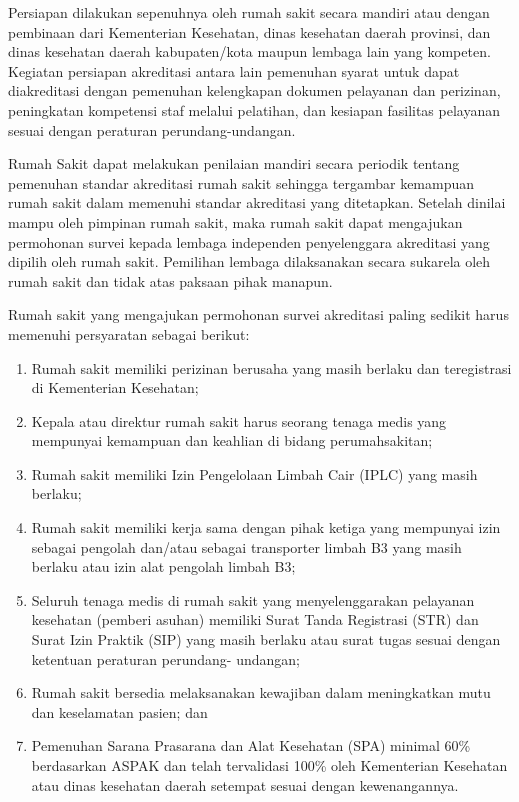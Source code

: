 \documentclass[
]{book}
\providecommand{\tightlist}{%
  \setlength{\itemsep}{0pt}\setlength{\parskip}{0pt}}
\begin{document}
Persiapan dilakukan sepenuhnya oleh rumah sakit secara mandiri atau dengan pembinaan dari Kementerian Kesehatan, dinas kesehatan daerah provinsi, dan dinas kesehatan daerah kabupaten/kota maupun lembaga lain yang kompeten. Kegiatan persiapan akreditasi antara lain pemenuhan syarat untuk dapat diakreditasi dengan pemenuhan kelengkapan dokumen pelayanan dan perizinan, peningkatan kompetensi staf melalui pelatihan, dan kesiapan fasilitas pelayanan sesuai dengan peraturan perundang-undangan.

Rumah Sakit dapat melakukan penilaian mandiri secara periodik tentang pemenuhan standar akreditasi rumah sakit sehingga tergambar kemampuan rumah sakit dalam memenuhi standar akreditasi yang ditetapkan. Setelah dinilai mampu oleh pimpinan rumah sakit, maka rumah sakit dapat mengajukan permohonan survei kepada lembaga independen penyelenggara akreditasi yang dipilih oleh rumah sakit. Pemilihan lembaga dilaksanakan secara sukarela oleh rumah sakit dan tidak atas paksaan pihak manapun.

Rumah sakit yang mengajukan permohonan survei akreditasi paling sedikit harus memenuhi persyaratan sebagai berikut:

\begin{enumerate}
\def\labelenumi{\arabic{enumi}.}
\tightlist
\item
  Rumah sakit memiliki perizinan berusaha yang masih berlaku dan teregistrasi di Kementerian Kesehatan;
\item
  Kepala atau direktur rumah sakit harus seorang tenaga medis yang mempunyai kemampuan dan keahlian di bidang perumahsakitan;
\item
  Rumah sakit memiliki Izin Pengelolaan Limbah Cair (IPLC) yang masih berlaku;
\item
  Rumah sakit memiliki kerja sama dengan pihak ketiga yang mempunyai izin sebagai pengolah dan/atau sebagai transporter limbah B3 yang masih berlaku atau izin alat pengolah limbah B3;
\item
  Seluruh tenaga medis di rumah sakit yang menyelenggarakan pelayanan kesehatan (pemberi asuhan) memiliki Surat Tanda Registrasi (STR) dan Surat Izin Praktik (SIP) yang masih berlaku atau surat tugas sesuai dengan ketentuan peraturan perundang- undangan;
\item
  Rumah sakit bersedia melaksanakan kewajiban dalam meningkatkan mutu dan keselamatan pasien; dan
\item
  Pemenuhan Sarana Prasarana dan Alat Kesehatan (SPA) minimal 60\% berdasarkan ASPAK dan telah tervalidasi 100\% oleh Kementerian Kesehatan atau dinas kesehatan daerah setempat sesuai dengan kewenangannya.
\end{enumerate}
\end{document}
